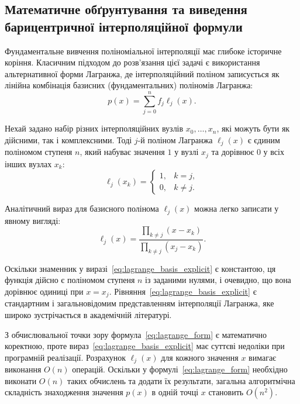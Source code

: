 \subsection{Математичне обґрунтування та виведення барицентричної інтерполяційної формули}

Фундаментальне вивчення поліноміальної інтерполяції має глибоке історичне коріння. Класичним підходом до розв'язання цієї задачі є використання альтернативної форми Лагранжа, де інтерполяційний поліном записується як лінійна комбінація базисних (фундаментальних) поліномів Лагранжа:
\begin{equation}\label{eq:lagrange_form}
	p(x) = \sum_{j=0}^{n} f_j \ell_j(x).
\end{equation}

Нехай задано набір різних інтерполяційних вузлів $x_0, \dots, x_n$, які можуть бути як дійсними, так і комплексними. Тоді $j$-й поліном Лагранжа $\ell_j(x)$ є єдиним поліномом ступеня $n$, який набуває значення $1$ у вузлі $x_j$ та дорівнює $0$ у всіх інших вузлах $x_k$:
\begin{equation}\label{eq:lagrange_basis_def}
	\ell_j(x_k) = 
	\begin{cases} 
		1, & k = j, \\ 
		0, & k \neq j. 
	\end{cases}
\end{equation}

Аналітичний вираз для базисного полінома $\ell_j(x)$ можна легко записати у явному вигляді:
\begin{equation}\label{eq:lagrange_basis_explicit}
	\ell_j(x) = \frac{\prod_{k \neq j} (x - x_k)}{\prod_{k \neq j} (x_j - x_k)}.
\end{equation}

Оскільки знаменник у виразі~\eqref{eq:lagrange_basis_explicit} є константою, ця функція дійсно є поліномом ступеня $n$ із заданими нулями, і очевидно, що вона дорівнює одиниці при $x = x_j$. Рівняння~\eqref{eq:lagrange_basis_explicit} є стандартним і загальновідомим представленням інтерполяції Лагранжа, яке широко зустрічається в академічній літературі.

З обчислювальної точки зору формула~\eqref{eq:lagrange_form} є математично коректною, проте вираз~\eqref{eq:lagrange_basis_explicit} має суттєві недоліки при програмній реалізації. Розрахунок $\ell_j(x)$ для кожного значення $x$ вимагає виконання $O(n)$ операцій. Оскільки у формулі~\eqref{eq:lagrange_form} необхідно виконати $O(n)$ таких обчислень та додати їх результати, загальна алгоритмічна складність знаходження значення $p(x)$ в одній точці $x$ становить $O(n^2)$.


